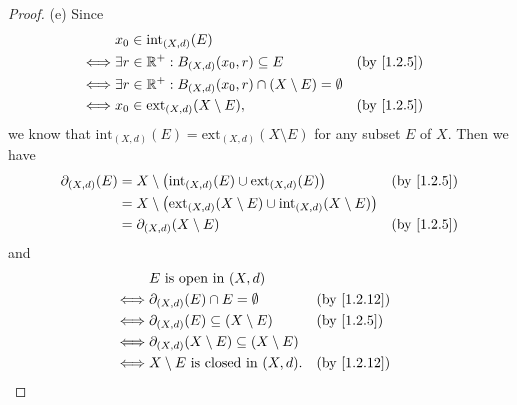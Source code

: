\begin{proof}{(e)}
  Since
  \begin{align*}
         & x_0 \in \text{int}_{(X, d)}(E)                                                           \\
    \iff & \exists r \in \R^+ : B_{(X, d)}(x_0, r) \subseteq E                      &  & \by{1.2.5} \\
    \iff & \exists r \in \R^+ : B_{(X, d)}(x_0, r) \cap (X \setminus E) = \emptyset                 \\
    \iff & x_0 \in \text{ext}_{(X, d)}(X \setminus E),                              &  & \by{1.2.5}
  \end{align*}
  we know that \(\text{int}_{(X, d)}(E) = \text{ext}_{(X, d)}(X \setminus E)\) for any subset \(E\) of \(X\).
  Then we have
  \begin{align*}
    \partial_{(X, d)}(E) & = X \setminus \big(\text{int}_{(X, d)}(E) \cup \text{ext}_{(X, d)}(E)\big)                         &  & \by{1.2.5} \\
                         & = X \setminus \big(\text{ext}_{(X, d)}(X \setminus E) \cup \text{int}_{(X, d)}(X \setminus E)\big)                 \\
                         & = \partial_{(X, d)}(X \setminus E)                                                                 &  & \by{1.2.5}
  \end{align*}
  and
  \begin{align*}
         & E \text{ is open in } (X, d)                                                \\
    \iff & \partial_{(X, d)}(E) \cap E = \emptyset                    &  & \by{1.2.12} \\
    \iff & \partial_{(X, d)}(E) \subseteq (X \setminus E)             &  & \by{1.2.5}  \\
    \iff & \partial_{(X, d)}(X \setminus E) \subseteq (X \setminus E)                  \\
    \iff & X \setminus E \text{ is closed in } (X, d).                &  & \by{1.2.12}
  \end{align*}
\end{proof}

